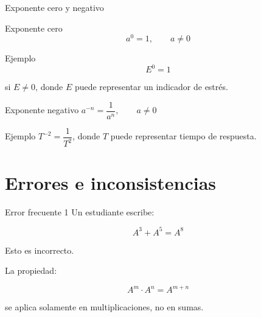 \documentclass[aspectratio=169]{beamer}
\begin{document}
	\begin{frame}{Exponente cero y negativo}
		\begin{block}{Exponente cero}
			\[
			a^0=1,\qquad a\neq 0
			\]
		\end{block}
		
		\pause
		
		\begin{exampleblock}{Ejemplo}
			\[
			E^0=1
			\]
			
			si \(E\neq 0\), donde \(E\) puede representar un indicador de estrés.
		\end{exampleblock}
		
		\pause
		
		\begin{block}{Exponente negativo}
			$a^{-n}=\dfrac{1}{a^n},	\qquad a\neq 0$
		\end{block}
		
		\pause
		
		\begin{exampleblock}{Ejemplo}
			$T^{-2}=\dfrac{1}{T^2}$, donde \(T\) puede representar tiempo de respuesta.
		\end{exampleblock}
	\end{frame}
	
	\section{Errores e inconsistencias}
	
	\begin{frame}{Error frecuente 1}
		Un estudiante escribe:
		
		\[
		A^3+A^5=A^8
		\]
		
		\pause
		
		\begin{alerta}
			Esto es incorrecto.
		\end{alerta}
		
		\pause
		
		La propiedad:
		
		\[
		A^m\cdot A^n=A^{m+n}
		\]
		
		se aplica solamente en multiplicaciones, no en sumas.
		
	\end{frame}
	
	
\end{document}
